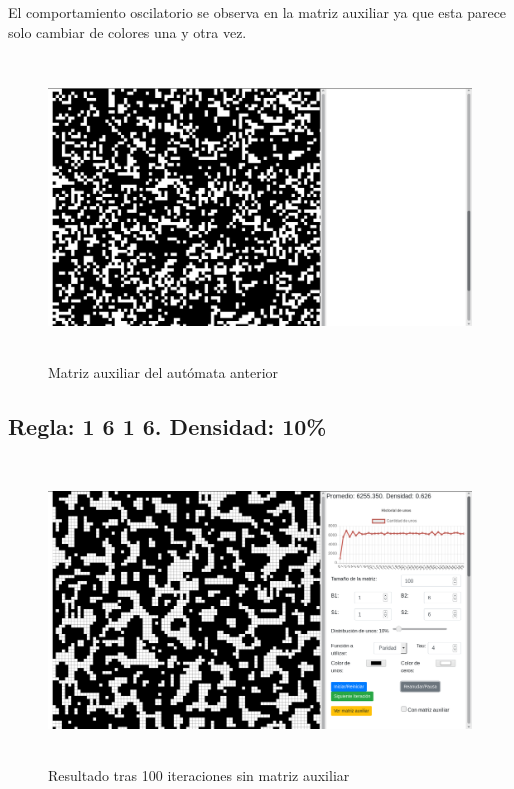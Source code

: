 \documentclass[12pt, titlepage]{article}
\begin{document}
El comportamiento oscilatorio se observa en la matriz auxiliar ya que esta parece solo cambiar de colores una y otra vez.
\begin{figure}[H]
\begin{center}
 \includegraphics[width=15cm, height=8cm]{./img/3634-paridad-aux.png}
 \caption{Matriz auxiliar del autómata anterior}
 \label{fig:3634-paridad-aux}
\end{center}
\end{figure}

\subsection{Regla: 1 6 1 6. Densidad: 10\%}

\begin{figure}[H]
\begin{center}
 \includegraphics[width=15cm, height=8cm]{./img/1616.png}
 \caption{Resultado tras 100 iteraciones sin matriz auxiliar}
 \label{fig:1616}
\end{center}
\end{figure}
\end{document}

